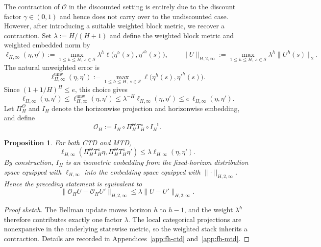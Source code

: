 \documentclass{article}
\newtheorem{proposition}[theorem]{Proposition}
\newcommand{\X}{\mathcal{S}}
\begin{document}
The contraction of $\mathcal O$ in the discounted setting is entirely due to the discount factor $\gamma \in (0,1)$ and hence does not carry over to the undiscounted case. However, after introducing a suitable weighted block metric, we recover a contraction. Set $ \lambda:=H/(H+1)$ and define the weighted block metric and weighted embedded norm by
\begin{equation}
\ell_{H,\infty}(\eta,\eta') := \max_{1\le h\le H,\ s\in \X} \lambda^h \ell\bigl(\eta^h(s),{\eta'}^h(s)\bigr), \qquad \lVert U \rVert_{H,2,\infty} := \max_{1\le h\le H,\ s\in \X} \lambda^h \lVert U^h(s) \rVert_2.
\end{equation}
The natural unweighted error is
\begin{equation}
\ell_{H,\infty}^{\mathrm{unw}}(\eta,\eta'):=\max_{1\le h\le H,\ s\in\X}\ell\bigl(\eta^h(s),{\eta'}^h(s)\bigr).
\end{equation}
Since $(1+1/H)^H\le e$, this choice gives
\begin{equation}
\ell_{H,\infty}(\eta,\eta')\le\ell_{H,\infty}^{\mathrm{unw}}(\eta,\eta')\le\lambda^{-H}\ell_{H,\infty}(\eta,\eta')\le e\,\ell_{H,\infty}(\eta,\eta').
\end{equation}
Let $\Pi_H^\Theta$ and $I_H$ denote the horizonwise projection and horizonwise embedding, and define
\begin{equation}
\mathcal O_H:=I_H\circ \Pi_H^\Theta T_H^\pi \circ I_H^{-1}.
\end{equation}

\begin{proposition}\label{prop:undisc-contract}
For both CTD and MTD,
\begin{equation}
\ell_{H,\infty}(\Pi_H^\Theta T_H^\pi \eta,\Pi_H^\Theta T_H^\pi \eta') \le \lambda \ell_{H,\infty}(\eta,\eta').
\end{equation}
By construction, $I_H$ is an isometric embedding from the fixed-horizon distribution space equipped with $\ell_{H,\infty}$ into the embedding space equipped with $\lVert \cdot \rVert_{H,2,\infty}$. Hence the preceding statement is equivalent to
\begin{equation}
\lVert \mathcal O_H U-\mathcal O_H U'\rVert_{H,2,\infty} \le \lambda \lVert U-U'\rVert_{H,2,\infty}.
\end{equation}
\end{proposition}
\begin{proof}[Proof sketch] 
The Bellman update moves horizon $h$ to $h-1$, and the weight $\lambda^h$ therefore contributes exactly one factor $\lambda$. The local categorical projections are nonexpansive in the underlying statewise metric, so the weighted stack inherits a contraction. Details are recorded in Appendices~\ref{app:fh-ctd} and~\ref{app:fh-mtd}.
\end{proof}
\end{document}
